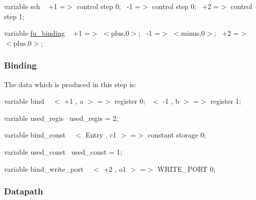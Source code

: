 \begin{DoxyItemize}
\item variable sch ~\newline
 +1 =$>$ control step 0;~\newline
 -\/1 =$>$ control step 0;~\newline
 +2 =$>$ control step 1;~\newline

\item variable \hyperlink{classfu__binding}{fu\+\_\+binding} ~\newline
 +1 =$>$ $<$plus,0$>$;~\newline
 -\/1 =$>$ $<$minus,0$>$;~\newline
 +2 =$>$ $<$plus,0$>$;~\newline

\end{DoxyItemize}\hypertarget{src_HLS_page_Binding}{}\subsubsection{Binding}\label{src_HLS_page_Binding}
The data which is produced in this step is\+:
\begin{DoxyItemize}
\item variable bind ~\newline
 $<$ +1 , a $>$ =$>$ register 0;~\newline
 $<$ -\/1 , b $>$ =$>$ register 1;~\newline

\item variable used\+\_\+regis~\newline
 used\+\_\+regis = 2;~\newline

\item variable bind\+\_\+const ~\newline
 $<$ Entry , c1 $>$ =$>$ constant storage 0;~\newline

\item variable used\+\_\+const~\newline
 used\+\_\+const = 1;~\newline

\item variable bind\+\_\+write\+\_\+port ~\newline
 $<$ +2 , o1 $>$ =$>$ W\+R\+I\+T\+E\+\_\+\+P\+O\+RT 0; 
\end{DoxyItemize}\hypertarget{src_HLS_page_Datapath}{}\subsubsection{Datapath}\label{src_HLS_page_Datapath}
